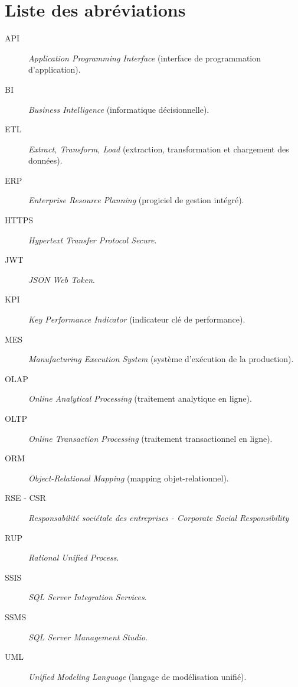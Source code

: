 \chapter*{Liste des abréviations}

\begin{description}
  \item[API] \emph{Application Programming Interface} (interface de programmation d’application).
  \item[BI] \emph{Business Intelligence} (informatique décisionnelle).
  \item[ETL] \emph{Extract, Transform, Load} (extraction, transformation et chargement des données).
  \item[ERP] \emph{Enterprise Resource Planning} (progiciel de gestion intégré).
  \item[HTTPS] \emph{Hypertext Transfer Protocol Secure}.
  \item[JWT] \emph{JSON Web Token}.
  \item[KPI] \emph{Key Performance Indicator} (indicateur clé de performance).
  \item[MES] \emph{Manufacturing Execution System} (système d’exécution de la production).
  \item[OLAP] \emph{Online Analytical Processing} (traitement analytique en ligne).
  \item[OLTP] \emph{Online Transaction Processing} (traitement transactionnel en ligne).
  \item[ORM] \emph{Object-Relational Mapping} (mapping objet-relationnel).
  \item[RSE - CSR] \emph{Responsabilité sociétale des entreprises - Corporate Social Responsibility}
  \item[RUP] \emph{Rational Unified Process}.
  \item[SSIS] \emph{SQL Server Integration Services}.
  \item[SSMS] \emph{SQL Server Management Studio}.
  \item[UML] \emph{Unified Modeling Language} (langage de modélisation unifié).
\end{description}
